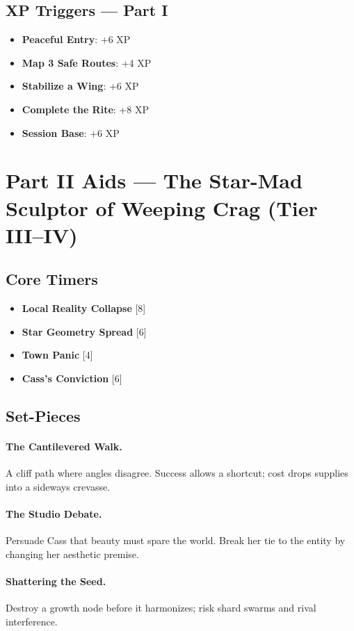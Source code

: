 \documentclass[11pt]{article}
\newcommand{\Clock}[2]{\textbf{#1} [#2]}
\begin{document}
\subsection*{XP Triggers --- Part I}
\begin{itemize}
\item \textbf{Peaceful Entry}: +6 XP
\item \textbf{Map 3 Safe Routes}: +4 XP
\item \textbf{Stabilize a Wing}: +6 XP
\item \textbf{Complete the Rite}: +8 XP
\item \textbf{Session Base}: +6 XP
\end{itemize}

\section{Part II Aids --- The Star-Mad Sculptor of Weeping Crag (Tier III--IV)}
\label{app:part2}
\subsection*{Core Timers}
\begin{itemize}
\item \Clock{Local Reality Collapse}{8}
\item \Clock{Star Geometry Spread}{6}
\item \Clock{Town Panic}{4}
\item \Clock{Cass's Conviction}{6}
\end{itemize}

\subsection*{Set-Pieces}
\paragraph{The Cantilevered Walk.} A cliff path where angles disagree. Success allows a shortcut; cost drops supplies into a sideways crevasse.
\paragraph{The Studio Debate.} Persuade Cass that beauty must spare the world. Break her tie to the entity by changing her aesthetic premise.
\paragraph{Shattering the Seed.} Destroy a growth node before it harmonizes; risk shard swarms and rival interference.
\end{document}
